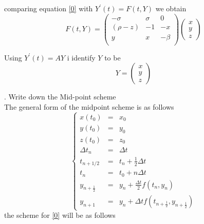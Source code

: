 \documentclass[12pt,a4paper]{article}
\begin{document}
comparing equation \ref{0} with  $ Y^{\prime}(t)=F(t,Y)$ we obtain
\begin{equation}
F(t,Y)=\begin{pmatrix}
-\sigma & \sigma & 0 \\ 
(\rho - z) & -1 & -x \\ 
y & x & -\beta \\ 
\end{pmatrix} \begin{pmatrix}
x \\ 
y \\ 
z
\end{pmatrix}
\label{1}
\end{equation}

Using $Y^{\prime}(t)=AY$ i identify $Y$ to be 
$$Y=\begin{pmatrix}
x \\ 
y \\ 
z
\end{pmatrix}$$

. Write down the Mid-point scheme\\
The general form of the midpoint scheme is as follows \\
$$
\left \{
\begin{array}{rcl}
x(t_0)&=&x_0\\
y(t_0)&=&y_0\\
z(t_0)&=&z_0 \\
\Delta t_{n}&=&\Delta t\\
t_{n+1/2} &=& t_n+\frac{1}{2}\Delta t \\
t_{n} &=& t_0+n\Delta t \\
y_{n+\frac{1}{2}}&=&y_{n} +\frac{\Delta t }{2}f(t_{n},y_n)\\
y_{n+1}&=&y_{n} +\Delta t f(t_{n+\frac{1}{2}},y_{n+\frac{1}{2}})
\end{array}
\right.
$$
the scheme for \ref{0} will be as follows 
 
\end{document}
